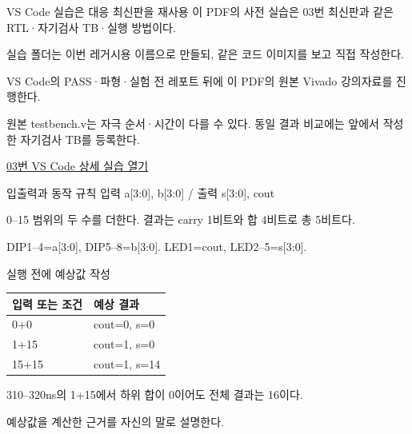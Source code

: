 \begin{frame}{VS Code 실습은 대응 최신판을 재사용}\relax
\small
이 PDF의 사전 실습은 03번 최신판과 같은 RTL·자기검사 TB·실행 방법이다.\par\vspace{0.22cm}실습 폴더는 이번 레거시용 이름으로 만들되, 같은 코드 이미지를 보고 직접 작성한다.\par\vspace{0.22cm}VS Code의 PASS·파형·실험 전 레포트 뒤에 이 PDF의 원본 Vivado 강의자료를 진행한다.\par\vspace{0.22cm}원본 testbench.v는 자극 순서·시간이 다를 수 있다. 동일 결과 비교에는 앞에서 작성한 자기검사 TB를 등록한다.\par\href{04.LAB1_03_ADDER4_VIVADO.pdf}{03번 VS Code 상세 실습 열기}
\end{frame}

\begin{frame}[label=legacy-03-sim]{입출력과 동작 규칙}\relax
\small
입력 a[3:0], b[3:0] / 출력 s[3:0], cout\par\vspace{0.22cm}0–15 범위의 두 수를 더한다. 결과는 carry 1비트와 합 4비트로 총 5비트다.\par\vspace{0.22cm}DIP1–4=a[3:0], DIP5–8=b[3:0]. LED1=cout, LED2–5=s[3:0].\par
\end{frame}

\begin{frame}{실행 전에 예상값 작성}\relax
\small
\begin{center}\renewcommand{\arraystretch}{1.45}
\begin{tabular}{l|l}
입력 또는 조건 & 예상 결과\\\hline
0+0 & cout=0, s=0\\
1+15 & cout=1, s=0\\
15+15 & cout=1, s=14\\
\end{tabular}\end{center}
310–320ns의 1+15에서 하위 합이 0이어도 전체 결과는 16이다.\par\vspace{0.22cm}예상값을 계산한 근거를 자신의 말로 설명한다.\par
\end{frame}

